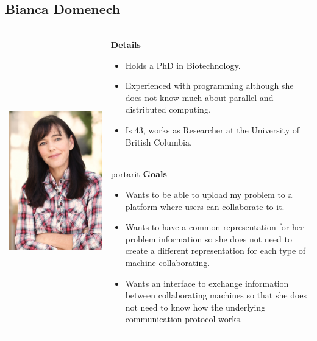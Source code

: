 \subsection*{Bianca Domenech}
\begin{table}[h]
\begin{tabular}{c p{}}
\multirow{2}{*}{
      \includegraphics[width=0.3\linewidth]{assets/images/woman1.png}
} 
& 
\multicolumn{1}{p{0.7\textwidth}}{
\textbf{Details}
\begin{itemize}
	\item Holds a PhD in Biotechnology.
	\item Experienced with programming although she does not know much about parallel and distributed computing.
	\item Is 43, works as Researcher at the University of British Columbia.
\end{itemize}
} \\
&portarit
\textbf{Goals} 
\begin{itemize}
	\item Wants to be able to upload my problem to a platform where users can collaborate to it. 
	\item Wants to have a common representation for her problem information so she does not need to create a different representation for each type of machine collaborating.
	\item Wants an interface to exchange information between collaborating machines so that she does not need to know how the underlying communication protocol works.
\end{itemize}   
\end{tabular}
\end{table}

\newpage
